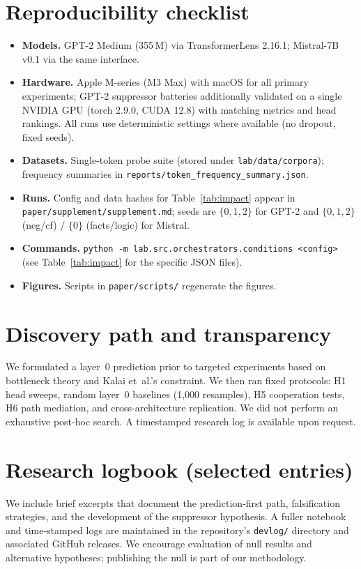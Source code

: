 \section{Reproducibility checklist}
\label{app:repro}

\begin{itemize}
    \item \textbf{Models.} GPT-2 Medium (355\,M) via TransformerLens 2.16.1; Mistral-7B v0.1 via the same interface.
    \item \textbf{Hardware.} Apple M-series (M3 Max) with macOS for all primary experiments; GPT-2 suppressor batteries additionally validated on a single NVIDIA GPU (torch 2.9.0, CUDA 12.8) with matching metrics and head rankings. All runs use deterministic settings where available (no dropout, fixed seeds).
    \item \textbf{Datasets.} Single-token probe suite (stored under \texttt{lab/data/corpora}); frequency summaries in \texttt{reports/token\_frequency\_summary.json}.
    \item \textbf{Runs.} Config and data hashes for Table~\ref{tab:impact} appear in \texttt{paper/supplement/supplement.md}; seeds are $\{0,1,2\}$ for GPT-2 and $\{0,1,2\}$ (neg/cf) / $\{0\}$ (facts/logic) for Mistral.
    \item \textbf{Commands.} \texttt{python -m lab.src.orchestrators.conditions <config>} (see Table~\ref{tab:impact} for the specific JSON files).
    \item \textbf{Figures.} Scripts in \texttt{paper/scripts/} regenerate the figures.
\end{itemize}

\section{Discovery path and transparency}\label{app:transparency}
We formulated a layer~0 prediction prior to targeted experiments based on bottleneck theory and Kalai et~al.'s constraint. We then ran fixed protocols: H1 head sweeps, random layer~0 baselines (1{,}000 resamples), H5 cooperation tests, H6 path mediation, and cross-architecture replication. We did not perform an exhaustive post-hoc search. A timestamped research log is available upon request.

\section{Research logbook (selected entries)}\label{app:logbook}
We include brief excerpts that document the prediction‑first path, falsification strategies, and the development of the suppressor hypothesis. A fuller notebook and time‑stamped logs are maintained in the repository’s \texttt{devlog/} directory and associated GitHub releases. We encourage evaluation of null results and alternative hypotheses; publishing the null is part of our methodology.
